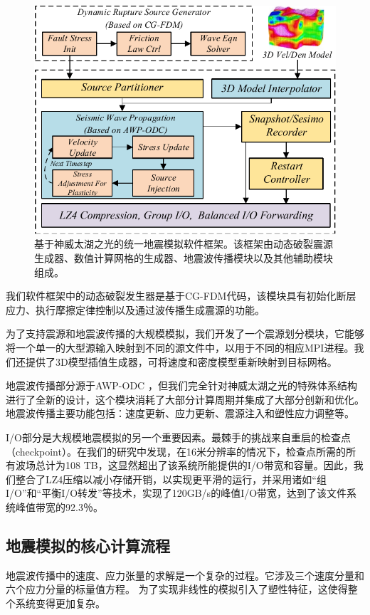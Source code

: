 \documentclass[degree=doctor]{thuthesis}
\begin{document}
\begin{figure}[ht]
\centering
\includegraphics[width=0.9\columnwidth]{architecture.pdf}
\caption{基于神威太湖之光的统一地震模拟软件框架。该框架由动态破裂震源生成器、数值计算网格的生成器、地震波传播模块以及其他辅助模块组成。}
\label{fig:framework}
\end{figure}

我们软件框架中的动态破裂发生器是基于CG-FDM代码\citep{zhang2014three}，该模块具有初始化断层应力、执行摩擦定律控制以及通过波传播生成震源的功能。

为了支持震源和地震波传播的大规模模拟，我们开发了一个震源划分模块，它能够将一个单一的大型源输入映射到不同的源文件中，以用于不同的相应MPI进程。我们还提供了3D模型插值生成器，可将速度和密度模型重新映射到目标网格。

地震波传播部分源于AWP-ODC \citep {cui2010scalable}，但我们完全针对神威太湖之光的特殊体系结构进行了全新的设计，这个模块消耗了大部分计算周期并集成了大部分创新和优化。地震波传播主要功能包括：速度更新、应力更新、震源注入和塑性应力调整等。

I/O部分是大规模地震模拟的另一个重要因素。最棘手的挑战来自重启的检查点（checkpoint）。在我们的研究中发现，在16米分辨率的情况下，检查点所需的所有波场总计为108 TB，这显然超出了该系统所能提供的I/O带宽和容量。因此，我们整合了LZ4压缩以减小存储开销，以实现更平滑的运行，并采用诸如“组I/O”和“平衡I/O转发”等技术，实现了120GB/s的峰值I/O带宽，达到了该文件系统峰值带宽的92.3％。

\subsection{地震模拟的核心计算流程}

地震波传播中的速度、应力张量的求解是一个复杂的过程。它涉及三个速度分量和六个应力分量的标量值方程。 为了实现非线性的模拟引入了塑性特征，这使得整个系统变得更加复杂。
\end{document}
